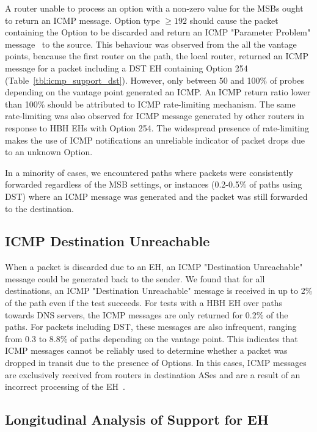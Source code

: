 \documentclass[conference]{IEEEtran}
\begin{document}
A router unable to process an option with a non-zero value
for the MSBs ought to return an ICMP message.
Option type $\ge 192$ should cause the packet containing the Option to be discarded and
return an ICMP "Parameter Problem" message~\cite{RFC8200} to the source.
This behaviour was  observed from the all the vantage points, beacause the
first router on the path, the local router, returned an
ICMP message for a packet including a DST EH containing Option 254
(Table~\ref{tbl:icmp_support_dst}).  However, only between 50 and 100\% of
probes depending on the vantage point generated an ICMP.
An ICMP return ratio lower than 100\% should be attributed to ICMP
rate-limiting mechanism.  The same
rate-limiting was also observed for ICMP message generated by other routers
 in response to HBH EHs with Option 254.  The widespread presence of
rate-limiting makes the use of ICMP notifications an unreliable
indicator of packet drops due to an unknown Option.

In a minority of cases, we encountered paths where packets were consistently
forwarded regardless of the MSB settings, or instances (0.2-0.5\% of paths
using DST) where an ICMP message
was generated and the packet was still forwarded to the destination.


\subsection{ICMP Destination Unreachable}

When a packet is discarded due to an EH, an ICMP "Destination Unreachable"
message could be generated back to the sender.
We found that for all destinations, an ICMP
"Destination Unreachable" message is received in up to 2\% of the path
even if the test succeeds.  For tests with a
HBH EH over paths towards DNS servers, the ICMP messages
are only returned for 0.2\% of the paths. For packets including DST, these messages
are also infrequent, ranging from 0.3 to 8.8\% of paths depending on the
vantage point. 
This indicates that ICMP messages cannot be reliably used to
determine whether a packet was dropped in transit due to the presence of Options.
In this cases, ICMP messages are exclusively received from
routers in destination ASes and are a result of an incorrect processing of the
EH~\cite{RFC8200}.


\subsection{Longitudinal Analysis of Support for EH}
\end{document}
